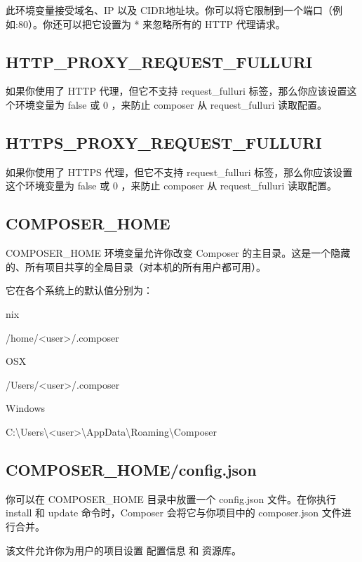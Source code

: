 此环境变量接受域名、IP 以及 CIDR地址块。你可以将它限制到一个端口（例如:80）。你还可以把它设置为 * 来忽略所有的 HTTP 代理请求。


\subsection{HTTP\_PROXY\_REQUEST\_FULLURI}

如果你使用了 HTTP 代理，但它不支持 request\_fulluri 标签，那么你应该设置这个环境变量为 false 或 0 ，来防止 composer 从 request\_fulluri 读取配置。

\subsection{HTTPS\_PROXY\_REQUEST\_FULLURI}

如果你使用了 HTTPS 代理，但它不支持 request\_fulluri 标签，那么你应该设置这个环境变量为 false 或 0 ，来防止 composer 从 request\_fulluri 读取配置。


\subsection{COMPOSER\_HOME}

COMPOSER\_HOME 环境变量允许你改变 Composer 的主目录。这是一个隐藏的、所有项目共享的全局目录（对本机的所有用户都可用）。

它在各个系统上的默认值分别为：

\begin{compactitem}
\item *nix

/home/<user>/.composer
\item OSX

/Users/<user>/.composer
\item Windows

C:\textbackslash Users\textbackslash <user>\textbackslash AppData\textbackslash Roaming\textbackslash Composer
\end{compactitem}

\subsection{COMPOSER\_HOME/config.json}

你可以在 COMPOSER\_HOME 目录中放置一个 config.json 文件。在你执行 install 和 update 命令时，Composer 会将它与你项目中的 composer.json 文件进行合并。

该文件允许你为用户的项目设置 配置信息 和 资源库。

